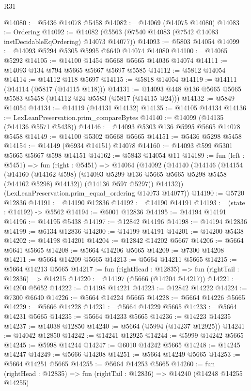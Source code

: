\begin{lexlean}{R31}
\begin{coremodule}
@14080 := @5436 @14078 @5458
@14082 := @14069 (@14075 @14080)
@14083 := Ordering
@14092 := @14082 (@5563 (@7540 @14083 (@7542 @14083 instDecidableEqOrdering) @14073 @14077))
@14093 := @5803 @14054
@14099 := @14093 @5294 @5305 @5995 @6640 @14074 @14080
@14100 := @14065 @5292
@14105 := @14100 @1454 @5668 @5665 @14036 @14074
@14111 := @14093 @134 @794 @5665 @5667 @5697 @5585
@14112 := @5812 @14054
@14114 := @14112 @118 @5697
@14115 := @5818 @14054
@14119 := @14111 (@14114 (@5817 (@14115 @118)))
@14131 := @14093 @448 @136 @5665 @5665 @5583 @5458 (@14112 @24 @5583 (@5817 (@14115 @24)))
@14132 := @5849 @14054
@14134 := @14119 (@14131 @14132)
@14135 := @14105 @14134
@14136 := LexLeanPreservation.prim_compareBytes
@14140 := @14099 (@14135 (@14136 @5571 @5438))
@14146 := @14093 @5303 @136 @5995 @5665 @14078 @5458
@14149 := @14100 @5302 @5668 @5665
@14151 := @5436 @5298 @5458
@14154 := @14149 (@6934 @14151) @14078
@14160 := @14093 @599 @5301 @5665 @5667 @598 @14151
@14162 := @5843 @14054 @11
@14189 := fun (left : @5451) =>
  fun (right : @5451) =>
  @14064
    (@14092
      (@14140
        (@14146
          (@14154
            (@14160 (@14162 @598) (@14093 @5299 @136 @5665 @5665 @5298 @5458 (@14162 @5298) @14132))
            (@14136 @597 @5297))
          @14132))
      (LexLeanPreservation.prim_equal_ordering @14073 @14077))
@14190 := @5720 @12836
@14191 := @14190 @12836
@14192 := @14190 @14191
@14193 := (state : @14192) -> @5562
@14194 := @6001 @12836
@14195 := @14194 @14191
@14196 := @14195 @5438
@14197 := @12842 @14196
@14198 := @14194 @12836
@14199 := @6134 @12836
@14200 := @14199 @14191
@14201 := @14200 @5438
@14202 := @14198 @14201
@14204 := @12842 @14202 @5667
@14206 := @5664 @6641 @5665
@14208 := @5664 @14206 @5665
@14209 := @7300 @14208
@14211 := @5664 @14209 @5665
@14213 := @5664 @14211 @5665
@14215 := @5664 @14213 @5665
@14217 := fun (rightHead : @12835) => fun (rightTail : @12836) => @14215
@14220 := @14197 (@5666 (@14204 @14217))
@14221 := @14200 @5652
@14222 := @14198 @14221
@14223 := @12842 @14222
@14224 := @7300 @6640
@14226 := @5664 @14224 @5665
@14228 := @5664 @14226 @5665
@14229 := @5666 @14228
@14231 := @5664 @14229 @5665
@14233 := @5664 @14231 @5665
@14235 := @5664 @14233 @5665
@14236 := @14223 @14235
@14237 := @14038 @12850
@14240 := @5664 (@5994 (@14237 @12925))
@14241 := @14042 @12850
@14242 := @14241 @12925
@14244 := @5999 @14242 @5665
@14245 := @5998 @14244
@14247 := @6010 @14242 @5665
@14248 := @14245 @14247
@14249 := @5666 @14208
@14251 := @5664 @14249 @5665
@14253 := @5664 @14251 @5665
@14255 := @5664 @14253 @5665
@14260 := fun (rightHead : @12835) => fun (rightTail : @12836) => @14240 (@14248 @14255 @14255)

\end{coremodule}
\end{lexlean}
